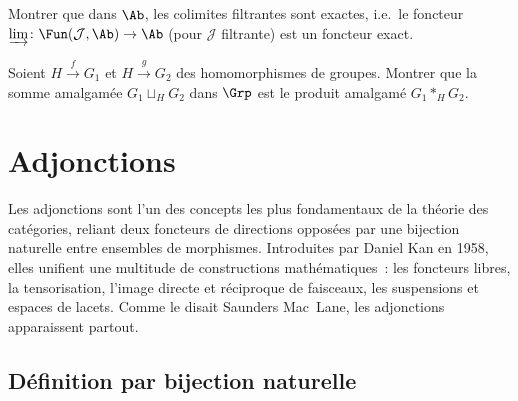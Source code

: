 \begin{exercice}\label{exo:colimite-filtrante-exacte}
Montrer que dans $\Ab$, les colimites filtrantes sont exactes,
i.e.\ le foncteur $\varinjlim\colon\Fun(\mathcal{J},\Ab)\to\Ab$
(pour $\mathcal{J}$ filtrante) est un foncteur exact.
\end{exercice}

\begin{exercice}\label{exo:pushout-dans-grp}
Soient $H\xrightarrow{f}G_1$ et $H\xrightarrow{g}G_2$ des
homomorphismes de groupes. Montrer que la somme amalgamée
$G_1\sqcup_H G_2$ dans $\Grp$ est le produit amalgamé
$G_1 *_H G_2$.
\end{exercice}




\chapter{Adjonctions}\label{ch:adjonctions}
\minitoc

\vspace{1em}

Les adjonctions sont l'un des concepts les plus fondamentaux de la théorie
des catégories, reliant deux foncteurs de directions opposées par une
bijection naturelle entre ensembles de morphismes.
Introduites par Daniel Kan en 1958,
elles unifient une multitude de constructions mathématiques~:
les foncteurs libres, la tensorisation, l'image directe et réciproque
de faisceaux, les suspensions et espaces de lacets.
Comme le disait Saunders Mac~Lane, \og{}les adjonctions
apparaissent partout\fg{}.


\section{Définition par bijection naturelle}\label{sec:adjonction-def}

